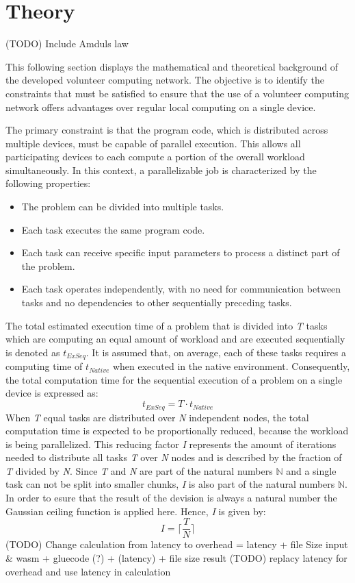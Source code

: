 \section{Theory}
\label{sec:concept:theory}
(TODO) Include Amduls law 

This following section displays the mathematical and theoretical background of the developed volunteer computing network. The objective is to identify the constraints that must be satisfied to ensure that the use of a volunteer computing network offers advantages over regular local computing on a single device.

The primary constraint is that the program code, which is distributed across multiple devices, must be capable of parallel execution. This allows all participating devices to each compute a portion of the overall workload simultaneously. In this context, a parallelizable job is characterized by the following properties:
\begin{itemize}
  \item The problem can be divided into multiple tasks.
  \item Each task executes the same program code.
  \item Each task can receive specific input parameters to process a distinct part of the problem.
  \item Each task operates independently, with no need for communication between tasks and no dependencies to other sequentially preceding tasks.
\end{itemize}
The total estimated execution time of a problem that is divided into \emph{T} tasks which are computing an equal amount of workload and are executed sequentially is denoted as $t_{ExSeq}$. It is assumed that, on average, each of these tasks requires a computing time of $t_{Native}$ when executed in the native environment. Consequently, the total computation time for the sequential execution of a problem on a single device is expressed as:
\begin{equation}
  t_{ExSeq} = T \cdot t_{Native}
  \label{equ:single}
\end{equation}
When \emph{T} equal tasks are distributed over \emph{N} independent nodes, the total computation time is expected to be proportionally reduced, because the workload is being parallelized. This reducing factor \emph{I} represents the amount of iterations needed to distribute all tasks \emph{T} over \emph{N} nodes and is described by the fraction of \emph{T} divided by \emph{N}. Since \emph{T} and \emph{N} are part of the natural numbers $\mathbb{N}$ and a single task can not be split into smaller chunks, \emph{I} is also part of the natural numbers $\mathbb{N}$. In order to esure that the result of the devision is always a natural number the Gaussian ceiling function is applied here. Hence, \emph{I} is given by: 
\begin{equation}
  I = \bigg\lceil\frac{T}{N}\bigg\rceil
  \label{equ:frac}
\end{equation}
(TODO) Change calculation from latency to overhead = latency + file Size input \& wasm + gluecode (?) + (latency) + file size result
(TODO) replacy latency for overhead and use latency in calculation

